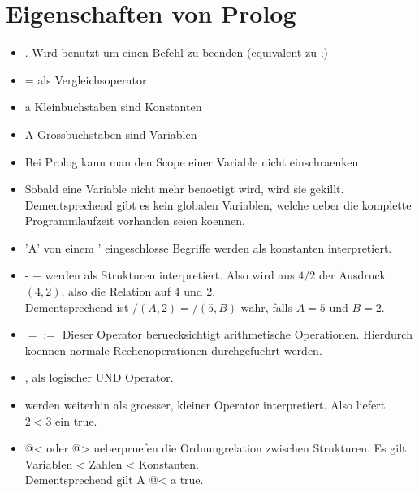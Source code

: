 \documentclass{article}
\begin{document}
\section*{Eigenschaften von Prolog}
    \begin{itemize}
        \item . Wird benutzt um einen Befehl zu beenden (equivalent zu ;)
        \item = als Vergleichsoperator
        \item a Kleinbuchstaben sind Konstanten
        \item A Grossbuchstaben sind Variablen
        \item Bei Prolog kann man den Scope einer Variable nicht einschraenken
        \item Sobald eine Variable nicht mehr benoetigt wird, wird sie gekillt.\\
              Dementsprechend gibt es kein globalen Variablen, welche ueber die komplette Programmlaufzeit vorhanden seien koennen.
        \item 'A' von einem ' eingeschlosse Begriffe werden als konstanten interpretiert.
        \item - + werden als Strukturen interpretiert. Also wird aus $4/2$ der Ausdruck $(4,2)$, also die Relation auf 4 und 2. \\
                Dementsprechend ist $/(A,2) = /(5,B)$ wahr, falls $A=5$ und $B=2$.
        \item $=:=$ Dieser Operator beruecksichtigt arithmetische Operationen. Hierdurch koennen normale Rechenoperationen durchgefuehrt werden.
        \item , als logischer UND Operator.
        \item < > werden weiterhin als groesser, kleiner Operator interpretiert. Also liefert $2<3$ ein true.
        \item @< oder @> ueberpruefen die Ordnungrelation zwischen Strukturen. Es gilt Variablen < Zahlen < Konstanten.\\
                Dementsprechend gilt A @< a true.
    \end{itemize}
\end{document}
